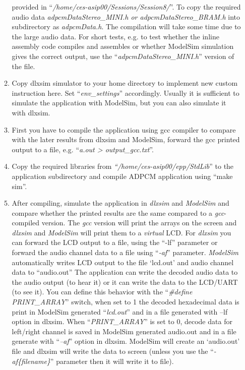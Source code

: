 \begin{enumerate}
\begin{enumerate}
		provided in ``\emph{/home/ces-asip00/Sessions/Session8/}''. To copy the
		required audio data \emph{adpcmDataStereo\_MINI.h or
			adpcmDataStereo\_BRAM.h} into subdirectory as \emph{adpcmData.h}.
		The compilation will take some time due to the large audio data. For
		short tests, e.g. to test whether the inline assembly code compiles
		and assembles or whether ModelSim simulation gives the correct
		output, use the ``\emph{adpcmDataStereo\_MINI.h}'' version of the
		file.
		\item
		Copy dlxsim simulator to your home directory to implement new custom
		instruction here. Set ``\emph{env\_settings}'' accordingly. Usually
		it is sufficient to simulate the application with ModelSim, but you
		can also simulate it with dlxsim.
		\item
		First you have to compile the application using gcc compiler to
		compare with the later results from dlxsim and ModelSim, forward the
		gcc printed output to a file, e.g. ``\emph{a.out \textgreater{}
			output\_gcc.txt}''.
		\item
		Copy the required libraries from \emph{``/home/ces-asip00/epp/StdLib}''
		to the application subdirectory and compile ADPCM application using
		``make sim''.
		\item
		After compiling, simulate the application in \emph{dlxsim} and
		\emph{ModelSim} and compare whether the printed results are the same
		compared to a \emph{gcc}-compiled version. The \emph{gcc} version
		will print the arrays on the screen and \emph{dlxsim} and
		\emph{ModelSim} will print them to a \emph{virtual} LCD. For
		\emph{dlxsim} you can forward the LCD output to a file, using the
		``-lf'' parameter or forward the audio channel data to a file using
		``\emph{-af}'' parameter. \emph{ModelSim} automatically writes LCD
		output to the file `lcd.out' and audio channel data to ``audio.out''
		The application can write the decoded audio data to the audio output
		(to hear it) or it can write the data to the LCD/UART (to see it).
		You can define this behavior with the ``\emph{\#define
			PRINT\_ARRAY}'' switch, when set to 1 the decoded hexadecimal data
		is print in ModelSim generated ``\emph{lcd.out}'' and in a file
		generated with --lf option in dlxsim. When ``\emph{PRINT\_ARRAY}''
		is set to 0, decode data for left/right channel is saved in ModelSim
		generated audio.out and in a file generate with ``\emph{--af}''
		option in dlxsim. ModelSim will create an `audio.out' file and
		dlxsim will write the data to screen (unless you use the
		``\emph{-af\{filename\}}'' parameter then it will write it to file).

\end{enumerate}
\end{enumerate}
